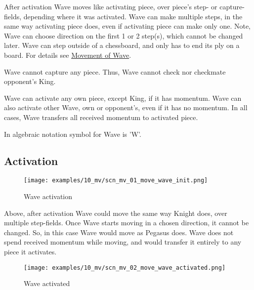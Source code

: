 After activation Wave moves like activating piece, over piece's step- or capture-
fields, depending where it was activated. Wave can make multiple steps, in the
same way activating piece does, even if activating piece can make only one. Note,
Wave can choose direction on the first 1 or 2 step(s), which cannot be changed
later. Wave can step outside of a chessboard, and only has to end its ply on a
board. For details see
\hyperref[sec:Appendix/Movement of Wave]{Movement of Wave}.

Wave cannot capture any piece. Thus, Wave cannot check nor checkmate opponent's
King.

Wave can activate any own piece, except King, if it has momentum. Wave can
also activate other Wave, own or opponent's, even if it has no momentum. In
all cases, Wave transfers all received momentum to activated piece.

In algebraic notation symbol for Wave is 'W'.

\clearpage %

\subsection*{Activation}

\vspace*{-2.0ex}
\noindent
\begin{figure}[h]
\texttt{[image: examples/10\_mv/scn\_mv\_01\_move\_wave\_init.png]}
\caption{Wave activation}
\label{fig:scn_mv_01_move_wave_init}
\end{figure}

Above, after activation Wave could move the same way Knight does, over multiple
step-fields. Once Wave starts moving in a chosen direction, it cannot be changed.
So, in this case Wave would move as Pegasus does. Wave does not spend received
momentum while moving, and would transfer it entirely to any piece it activates.

\clearpage %

\noindent
\begin{figure}[h]
\texttt{[image: examples/10\_mv/scn\_mv\_02\_move\_wave\_activated.png]}
\caption{Wave activated}
\label{fig:scn_mv_02_move_wave_activated}
\end{figure}

